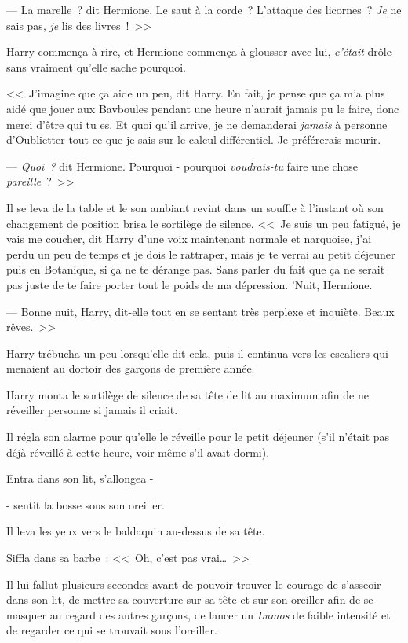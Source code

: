 --- La marelle~? dit Hermione. Le saut à la corde~? L'attaque des licornes~? \emph{Je} ne sais pas, \emph{je} lis des livres~!~>>

Harry commença à rire, et Hermione commença à glousser avec lui, \emph{c'était} drôle sans vraiment qu'elle sache pourquoi.

<<~J'imagine que ça aide un peu, dit Harry. En fait, je pense que ça m'a plus aidé que jouer aux Bavboules pendant une heure n'aurait jamais pu le faire, donc merci d'être qui tu es. Et quoi qu'il arrive, je ne demanderai \emph{jamais} à personne d'Oublietter tout ce que je sais sur le calcul différentiel. Je préférerais mourir.

--- \emph{Quoi~?} dit Hermione. Pourquoi - pourquoi \emph{voudrais-tu} faire une chose \emph{pareille}~?~>>

Il se leva de la table et le son ambiant revint dans un souffle à l'instant où son changement de position brisa le sortilège de silence. <<~Je suis un peu fatigué, je vais me coucher, dit Harry d'une voix maintenant normale et narquoise, j'ai perdu un peu de temps et je dois le rattraper, mais je te verrai au petit déjeuner puis en Botanique, si ça ne te dérange pas. Sans parler du fait que ça ne serait pas juste de te faire porter tout le poids de ma dépression. 'Nuit, Hermione.

--- Bonne nuit, Harry, dit-elle tout en se sentant très perplexe et inquiète. Beaux rêves.~>>

Harry trébucha un peu lorsqu'elle dit cela, puis il continua vers les escaliers qui menaient au dortoir des garçons de première année.

\later

Harry monta le sortilège de silence de sa tête de lit au maximum afin de ne réveiller personne si jamais il criait.

Il régla son alarme pour qu'elle le réveille pour le petit déjeuner (s'il n'était pas déjà réveillé à cette heure, voir même s'il avait dormi).

Entra dans son lit, s'allongea -

- sentit la bosse sous son oreiller.

Il leva les yeux vers le baldaquin au-dessus de sa tête.

Siffla dans sa barbe~: <<~Oh, c'est pas vrai…~>>

Il lui fallut plusieurs secondes avant de pouvoir trouver le courage de s'asseoir dans son lit, de mettre sa couverture sur sa tête et sur son oreiller afin de se masquer au regard des autres garçons, de lancer un \emph{Lumos} de faible intensité et de regarder ce qui se trouvait sous l'oreiller.

